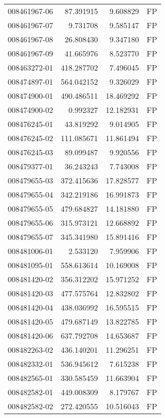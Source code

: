 \begin{tabular}{lrrl}
008461967-06 &   87.391915 &     9.608829 &   FP \\
008461967-07 &    9.731708 &     9.585147 &   FP \\
008461967-08 &   26.808430 &     9.347180 &   FP \\
008461967-09 &   41.665976 &     8.523770 &   FP \\
008463272-01 &  418.287702 &     7.496045 &   FP \\
008474897-01 &  564.042152 &     9.326029 &   FP \\
008474900-01 &  490.486511 &    18.469292 &   FP \\
008474900-02 &    0.992327 &    12.182931 &   FP \\
008476245-01 &   43.819292 &     9.014905 &   FP \\
008476245-02 &  111.085671 &    11.861494 &   FP \\
008476245-03 &   89.099487 &     9.920556 &   FP \\
008479377-01 &   36.243243 &     7.743008 &   FP \\
008479655-03 &  372.415636 &    17.828577 &   FP \\
008479655-04 &  342.219186 &    16.991873 &   FP \\
008479655-05 &  479.684827 &    14.181880 &   FP \\
008479655-06 &  315.973121 &    12.668892 &   FP \\
008479655-07 &  345.341980 &    15.891416 &   FP \\
008481006-01 &    2.533120 &     7.959906 &   FP \\
008481095-01 &  558.613614 &    10.169008 &   FP \\
008481420-02 &  356.312202 &    15.971252 &   FP \\
008481420-03 &  477.575764 &    12.832802 &   FP \\
008481420-04 &  438.036992 &    16.595515 &   FP \\
008481420-05 &  479.687149 &    13.822785 &   FP \\
008481420-06 &  637.792708 &    14.653687 &   FP \\
008482263-02 &  436.140201 &    11.296251 &   FP \\
008482332-01 &  536.945612 &     7.615238 &   FP \\
008482565-01 &  330.585459 &    11.663904 &   FP \\
008482582-01 &  449.008309 &     8.179767 &   FP \\
008482582-02 &  272.420555 &    10.516043 &   FP \\

\end{tabular}
